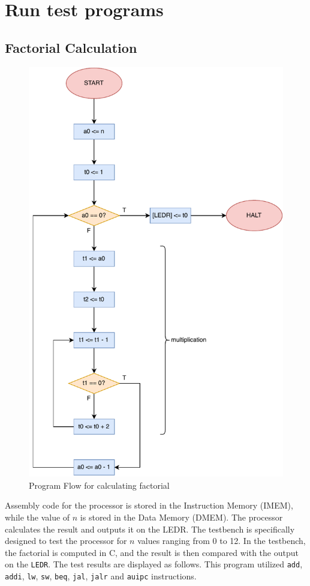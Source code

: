 \documentclass[12pt,a4paper,oneside]{book} %
\begin{document}
\section{Run test programs}
\subsection{Factorial Calculation}
\begin{figure}[H]
    \centering
    \includegraphics[width=.7\textwidth]{images/flowchart/factorial.pdf}
    \caption{Program Flow for calculating factorial}
\end{figure}

Assembly code for the processor is stored in the Instruction Memory (IMEM), while the value of $n$ is stored in the Data Memory (DMEM). The processor calculates the result and outputs it on the LEDR. The testbench is specifically designed to test the processor for $n$ values ranging from 0 to 12. In the testbench, the factorial is computed in C, and the result is then compared with the output on the \texttt{LEDR}. The test results are displayed as follows. This program utilized \texttt{add}, \texttt{addi}, \texttt{lw}, \texttt{sw}, \texttt{beq}, \texttt{jal}, \texttt{jalr} and \texttt{auipc} instructions.
\end{document}
